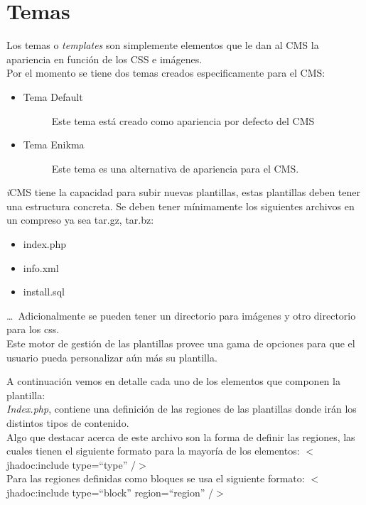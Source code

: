\section{Temas}
Los temas o \textit{templates} son simplemente elementos que le dan al CMS la apariencia en funci\'on de los CSS e im\'agenes.\\
Por el momento se tiene dos temas creados especificamente para el CMS:

\begin{itemize}
\item \begin{description}
	\item[Tema Default] Este tema est\'a creado como apariencia por defecto del CMS
\end{description}
\item \begin{description}
	\item[Tema Enikma] Este tema es una alternativa de apariencia para el CMS.
\end{description}
\end{itemize}

\textit{i}CMS tiene la capacidad para subir nuevas plantillas, estas plantillas deben tener una estructura concreta. Se deben tener m\'inimamente los siguientes archivos en un compreso ya sea tar.gz, tar.bz:
\begin{itemize}
\item index.php
\item info.xml
\item install.sql
\end{itemize}
\ldots\ Adicionalmente se pueden tener un directorio para im\'agenes y otro directorio para los css.\\
Este motor de gesti\'on de las plantillas provee una gama de opciones para que el usuario pueda personalizar a\'un m\'as su plantilla.

A continuaci\'on vemos en detalle cada uno de los elementos que componen la plantilla:\\

\emph{Index.php}, contiene una definici\'on de las regiones de las plantillas donde ir\'an los distintos tipos de contenido.\\



Algo que destacar acerca de este archivo son la forma de definir las regiones, las cuales tienen el siguiente formato para la mayor\'ia de los elementos: $<$jhadoc:include type=``type'' /$>$\\
Para las regiones definidas como bloques se usa el siguiente formato: $<$jhadoc:include type=``block'' region=``region'' /$>$\\

